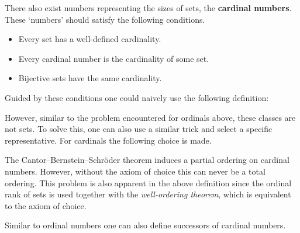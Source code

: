     There also exist numbers representing the sizes of sets, the \textbf{cardinal numbers}. These `numbers' should satisfy the following conditions.
    \begin{itemize}
        \item Every set has a well-defined cardinality.
        \item Every cardinal number is the cardinality of some set.
        \item Bijective sets have the same cardinality.
    \end{itemize}
    Guided by these conditions one could naively use the following definition:

    However, similar to the problem encountered for ordinals above, these classes are not sets. To solve this, one can also use a similar trick and select a specific representative. For cardinals the following choice is made.

    \begin{remark}[Ordering]
        The Cantor--Bernstein--Schr\"oder theorem induces a partial ordering on cardinal numbers. However, without the axiom of choice this can never be a total ordering. This problem is also apparent in the above definition since the ordinal rank of sets is used together with the \textit{well-ordering theorem}, which is equivalent to the axiom of choice.
    \end{remark}

    Similar to ordinal numbers one can also define successors of cardinal numbers.


